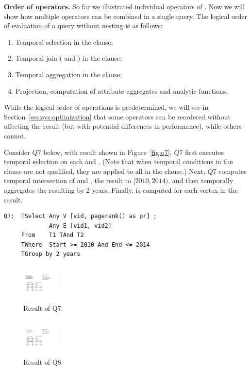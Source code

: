 {\bf Order of operators.} So far we illustrated individual operators
of \ql.  Now we will show how multiple operators can be combined in a
single query.  The logical order of evaluation of a \ql query without
nesting is as follows:

\begin{enumerate}
\item Temporal selection in the  clause;
\item Temporal join ( and ) in the 
  clause;
\item Temporal aggregation in the  clause;
\item Projection, computation of attribute aggregates and analytic
  functions.
\end{enumerate}

While the logical order of operations is predetermined, we will see in
Section~\ref{sec:sys:optimization} that some operators can be
reordered without affecting the result (but with potential differences
in performance), while others cannot.  

Consider $Q7$ below, with result shown in Figure~\ref{fig:q7}. $Q7$
first executes temporal selection on each  and .
(Note that when temporal conditions in the  clause are
not qualified, they are applied to all \tgs in the 
clause.)  Next, $Q7$ computes temporal intersection of  and
, the result to $[2010, 2014)$, and then temporally
  aggregates the resulting \tg by 2 years.  Finally,
   is computed for each vertex in the result.

\begin{small}
\begin{verbatim}
Q7:  TSelect Any V [vid, pagerank() as pr] ; 
             Any E [vid1, vid2] 
     From    T1 TAnd T2 
     TWhere  Start >= 2010 And End <= 2014 
     TGroup by 2 years
\end{verbatim}
\end{small}

\begin{figure}
\centering
\begin{minipage}{1.6in}
  \centering
  \includegraphics[width=0.8in]{figs/q7.pdf}
\vspace{-0.1in}
  \caption{Result of Q7.}{}
\vspace{-0.1in}
  \label{fig:q7}
\end{minipage}%
\begin{minipage}{1.6in}
  \centering
  \includegraphics[width=0.8in]{figs/q8.pdf}
\vspace{-0.1in}
  \caption{Result of Q8.}{}
  \label{fig:q8}
\vspace{-0.1in}
\end{minipage}
\end{figure}

